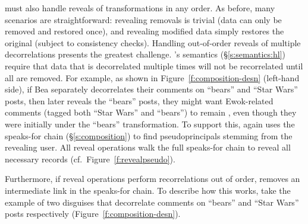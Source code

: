 \sys must also handle reveals of transformations in any order.  As before,
many scenarios are straightforward: revealing removals is trivial (data can
only be removed and restored once), and revealing modified data simply restores
the original (subject to consistency checks).
%
Handling out-of-order reveals of multiple decorrelations presents the greatest
challenge.
%
\sys's semantics (\S\ref{s:semantics:hl}) require that data that is decorrelated
multiple times will not be recorrelated until all \xxs are removed.
%
For example, as shown in Figure~\ref{f:composition-desn} (left-hand side), if Bea
separately decorrelates their comments on ``bears'' and ``Star Wars'' posts,
then later reveals the ``bears'' posts, they might want Ewok-related comments
(tagged both ``Star Wars'' and ``bears'') to remain \xxed, even though they were
initially \xxed under the ``bears'' transformation.
%
%
%
To support this, \sys again uses the speaks-for chain (\S\ref{s:composition}) to
find pseudoprincipals stemming from the revealing user.
%
All reveal operations walk the full speaks-for chain to reveal all necessary
records (cf.\ Figure~\ref{f:revealpseudo}).

Furthermore, if reveal operations perform recorrelations out of order, \sys
removes an intermediate link in the speaks-for chain.
%
To describe how this works, take the example of two disguises that decorrelate
comments on ``bears'' and ``Star Wars'' posts respectively
(Figure~\ref{f:composition-desn}). 

